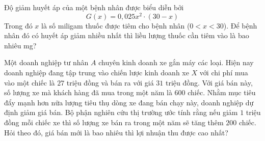 \begin{bt}%
	Độ giảm huyết áp của một bệnh  nhân được biểu diễn bởi
	 $$G(x)=0{,}025x^2\cdot(30-x)$$
	Trong đó  $x$ là số miligam thuốc được tiêm cho bệnh nhân ($0<x<30$). Để bệnh nhân đó có huyết áp giảm nhiều nhất thì liều lượng thuốc cần tiêm vào là bao nhiêu mg?
\end{bt}

\begin{bt}%
	Một doanh nghiệp tư nhân $A$ chuyên kinh doanh xe gắn máy các loại. Hiện nay doanh nghiệp đang tập trung vào chiến lược kinh doanh xe $X$ với chi phí mua vào một chiếc là $27$ triệu đồng và bán ra với giá $31$ triệu đồng. Với giá bán này, số lượng xe mà khách hàng đã mua trong một năm là $600$ chiếc. Nhằm mục tiêu đẩy mạnh hơn nữa lượng tiêu thụ dòng xe đang bán chạy này, doanh nghiệp dự định giảm giá bán. Bộ phận nghiên cứu thị trường ước  tính rằng nếu giảm $1$ triệu đồng mỗi chiếc xe thì số lượng xe bán ra trong một năm sẽ tăng thêm $200$ chiếc. Hỏi theo đó, giá bán mới là bao nhiêu thì lợi nhuận thu được cao nhất?
\end{bt}

